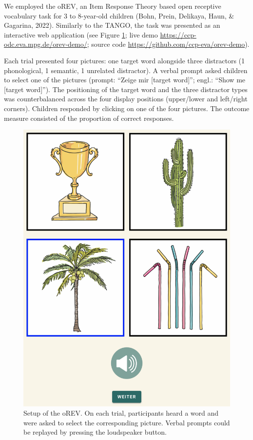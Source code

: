\documentclass[
  man,floatsintext]{apa6}
\begin{document}
We employed the oREV, an Item Response Theory based open receptive vocabulary task for 3 to 8-year-old children (Bohn, Prein, Delikaya, Haun, \& Gagarina, 2022). Similarly to the TANGO, the task was presented as an interactive web application (see Figure \ref{fig:fig5}; live demo \url{https://ccp-odc.eva.mpg.de/orev-demo/}; source code \url{https://github.com/ccp-eva/orev-demo}).

Each trial presented four pictures: one target word alongside three distractors (1 phonological, 1 semantic, 1 unrelated distractor). A verbal prompt asked children to select one of the pictures (prompt: ``Zeige mir {[}target word{]}''; engl.: ``Show me {[}target word{]}''). The positioning of the target word and the three distractor types was counterbalanced across the four display positions (upper/lower and left/right corners). Children responded by clicking on one of the four pictures. The outcome measure consisted of the proportion of correct responses.



\begin{figure}

{\centering \includegraphics[width=1\linewidth]{../figures/orev_procedure} 

}

\caption{Setup of the oREV. On each trial, participants heard a word and were asked to select the corresponding picture. Verbal prompts could be replayed by pressing the loudspeaker button.}\label{fig:fig5}
\end{figure}
\end{document}
